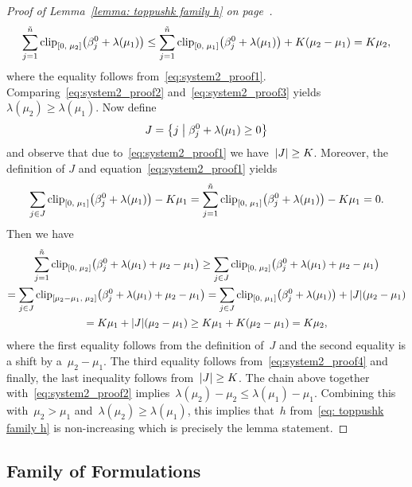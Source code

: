 \begin{proof}[Proof of Lemma~\ref{lemma: toppushk family h} on page~\pageref{lemma: toppushk family h}]
  \begin{equation}\label{eq:system2_proof3}
    \sum_{j=1}^{\ntil} \clip{0}{\mu_2}{\beta_j^0 + \lambda(\mu_1)}
      \le \sum_{j=1}^{\ntil} \clip{0}{\mu_1}{\beta_j^0 + \lambda(\mu_1)} + K(\mu_2 - \mu_1)
      = K \mu_2,
  \end{equation}
  where the equality follows from~\eqref{eq:system2_proof1}. Comparing~\eqref{eq:system2_proof2} and~\eqref{eq:system2_proof3} yields~$\lambda(\mu_2) \ge \lambda(\mu_1)$. Now define
  \begin{equation*}
    J = \Set{j}{\beta_j^0 + \lambda(\mu_1) \ge 0}
  \end{equation*}
  and observe that due to~\eqref{eq:system2_proof1} we have~$|J| \ge K$. Moreover, the definition of $J$ and equation~\eqref{eq:system2_proof1} yields
  \begin{equation}\label{eq:system2_proof4}
    \sum_{j \in J} \clip{0}{\mu_1}{\beta_j^0 + \lambda(\mu_1)} - K\mu_1
      = \sum_{j=1}^{\ntil} \clip{0}{\mu_1}{\beta_j^0 + \lambda(\mu_1)} - K\mu_1
      = 0.
  \end{equation}
  Then we have
  \begin{multline*}
    \sum_{j=1}^{\ntil} \clip{0}{\mu_2}{\beta_j^0 + \lambda(\mu_1) + \mu_2 - \mu_1}
      \ge \sum_{j \in J} \clip{0}{\mu_2}{\beta_j^0 + \lambda(\mu_1) + \mu_2 - \mu_1} \\
      = \sum_{j \in J} \clip{\mu_2 - \mu_1}{\mu_2}{\beta_j^0 + \lambda(\mu_1) + \mu_2 - \mu_1} 
      = \sum_{j \in J} \clip{0}{\mu_1}{\beta_j^0 + \lambda(\mu_1)} + \abs{J}(\mu_2 - \mu_1) \\
      = K\mu_1 + \abs{J}(\mu_2 - \mu_1)
      \ge K\mu_1 + K(\mu_2 - \mu_1)
      = K\mu_2,
  \end{multline*}
  where the first equality follows from the definition of~$J$ and the second equality is a shift by a~$\mu_2- \mu_1.$ The third equality follows from~\eqref{eq:system2_proof4} and finally, the last inequality follows from~$|J| \ge K$. The chain above together with~\eqref{eq:system2_proof2} implies~$\lambda(\mu_2) - \mu_2 \le \lambda(\mu_1)- \mu_1$. Combining this with~$\mu_2 > \mu_1$ and~$\lambda(\mu_2) \ge \lambda(\mu_1)$, this implies that~$h$ from~\eqref{eq: toppushk family h} is non-increasing which is precisely the lemma statement.
\end{proof}

\pagebreak

\subsection{Family of \PatMat Formulations}\label{sec: patmat family coordinate proofs}
